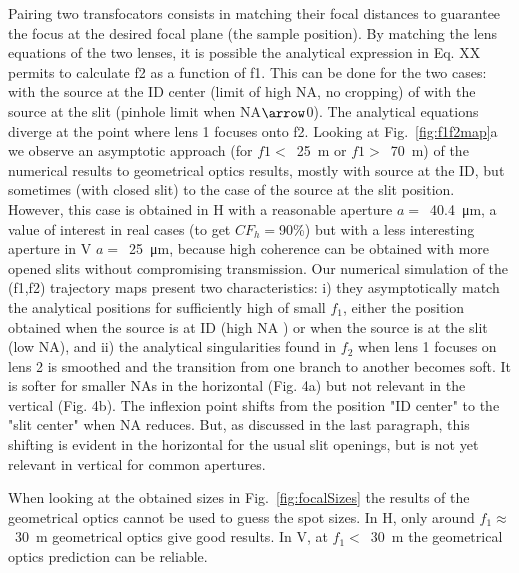 \documentclass{iucr}              %
\newcommand{\inblue}[1]{{\color{blue}#1}}
\begin{document}
Pairing two transfocators consists in matching their focal distances to guarantee the focus at the desired focal plane (the sample position). By matching the lens equations of the two lenses, it is possible the analytical expression in Eq. XX permits to calculate f2 as a function of f1. This can be done for the two cases: with the source at the ID center (limit of high NA, no cropping) of with the source at the slit (pinhole limit when NA$\arrow$0). The analytical equations diverge at the point where lens 1 focuses onto f2.
\inblue{Looking at Fig.~\ref{fig:f1f2map}a we observe an asymptotic approach (for $f1<$~\SI{25}{\meter} or $f1>$~\SI{70}{\meter}) of the numerical results to geometrical optics results, mostly with source at the ID, but sometimes (with closed slit) to the case of the source at the slit position. However, this case is obtained in H with a reasonable aperture $a=$~\SI{40.4}{\micro\meter}, a value of interest in real cases (to get $CF_h=$90\%) but with a less interesting aperture in V $a=$~\SI{25}{\micro\meter}, because high coherence can be obtained with more opened slits without compromising transmission. }
Our numerical simulation of the (f1,f2) trajectory maps present two characteristics: i) they asymptotically match the analytical positions for sufficiently high of small $f_1$, either the position obtained when the source is at ID (high NA ) or when the source is at the slit (low NA), and ii) the analytical singularities found in $f_2$ when lens 1 focuses on lens 2 is smoothed and the transition from one branch to another becomes soft. It is softer for smaller NAs in the horizontal (Fig. 4a) but not relevant in the vertical (Fig. 4b). The inflexion point shifts from the position "ID center" to the "slit center" when NA reduces. But, as discussed in the last paragraph, this shifting is evident in the horizontal for the usual slit openings, but is not yet relevant in vertical for common apertures. 

When looking at the obtained sizes in Fig.~\ref{fig:focalSizes} the results of the geometrical optics cannot be used to guess the spot sizes. In H, only around $f_1\approx$~\SI{30}{\meter} geometrical optics give good results. In V, at  $f_1 <$~\SI{30}{\meter} the geometrical optics prediction can be reliable. 
 




    
\end{document}
